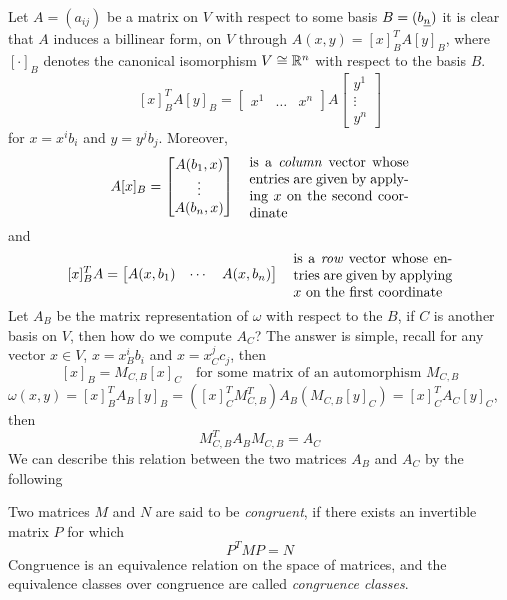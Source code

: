 \documentclass[../main-v2-manifolds.tex]{subfiles}
\begin{document}
    Let $A = (a_{ij})$ be a matrix on $V$ with respect to some basis $B = (\Ul{b}[n])$ it is clear that $A$ induces a billinear form, on $V$ through $A(x,y) = [x]_B^TA[y]_B$, where $[\cdot]_B$ denotes the canonical isomorphism $V\cong {\mathbb{R}^n}$ with respect to the basis $B$.
    \[
        [x]_B^T A [y]_B = \begin{bmatrix}
            x^1 &\ldots & x^n
        \end{bmatrix}A \begin{bmatrix}
            y^1\\
            \vdots\\
            y^n
        \end{bmatrix}
    \]
    for $x = x^ib_i$ and $y = y^jb_j$. Moreover,
    \[
        A[x]_B = \begin{bmatrix}
            A(b_1,x)\\
            \vdots\\
            A(b_n,x)
        \end{bmatrix}\quad \parbox{4cm}{is a \emph{column} vector whose entries are given by applying $x$ on the second coordinate}
    \]
    and 
    \[
        [x]_B^T A = \begin{bmatrix}
            A(x,b_1) & \cdots & A(x, b_n)
        \end{bmatrix}\quad\parbox{4cm}{is a \emph{row} vector whose entries are given by applying $x$ on the first coordinate}
    \]
    Let $A_B$ be the matrix representation of $\omega$ with respect to the $B$, if $C$ is another basis on $V$, then how do we compute $A_C$? The answer is simple, recall for any vector $x\in V$, $x = x^i_Bb_i$ and $x = x^j_C c_j$, then
    \[
        [x]_B = M_{C,B}[x]_C\quad\text{for some matrix of an automorphism }M_{C,B}
    \]
    $\omega(x,y) = [x]_B^TA_B[y]_B = ([x]_C^TM_{C,B}^T)A_B(M_{C,B}[y]_C) = [x]_C^T A_C [y]_C$, then
    \begin{equation}\label{lee-chp22:congruent-matrices}
        M^T_{C,B}A_BM_{C,B} = A_C
    \end{equation}
    We can describe this relation between the two matrices $A_B$ and $A_C$ by the following
    \begin{definition}
        Two matrices $M$ and $N$ are said to be \emph{congruent}, if there exists an invertible matrix $P$ for which
        \[
            P^TMP = N
        \]
        Congruence is an equivalence relation on the space of matrices, and the equivalence classes over congruence are called \emph{congruence classes}.
    \end{definition}
\end{document}
